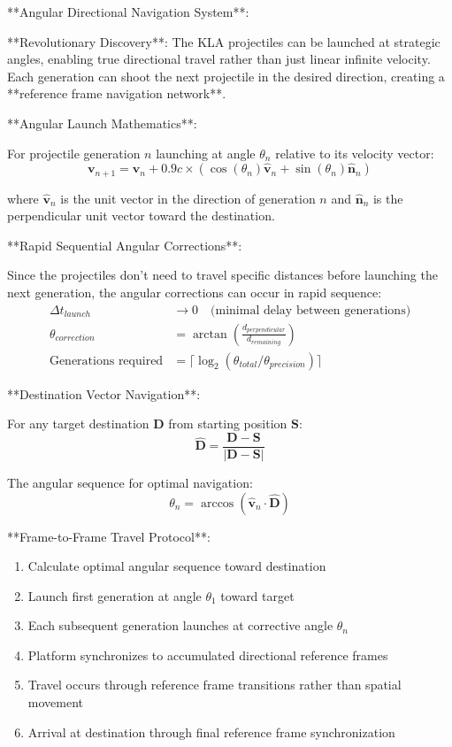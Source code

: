 \documentclass[12pt,a4paper]{article}
\theoremstyle{remark}
\begin{document}
**Angular Directional Navigation System**:

**Revolutionary Discovery**: The KLA projectiles can be launched at strategic angles, enabling true directional travel rather than just linear infinite velocity. Each generation can shoot the next projectile in the desired direction, creating a **reference frame navigation network**.

**Angular Launch Mathematics**:

For projectile generation $n$ launching at angle $\theta_n$ relative to its velocity vector:
\begin{equation}
\mathbf{v}_{n+1} = \mathbf{v}_n + 0.9c \times (\cos(\theta_n)\hat{\mathbf{v}}_n + \sin(\theta_n)\hat{\mathbf{n}}_n)
\end{equation}

where $\hat{\mathbf{v}}_n$ is the unit vector in the direction of generation $n$ and $\hat{\mathbf{n}}_n$ is the perpendicular unit vector toward the destination.

**Rapid Sequential Angular Corrections**:

Since the projectiles don't need to travel specific distances before launching the next generation, the angular corrections can occur in rapid sequence:
\begin{align}
\Delta t_{launch} &\rightarrow 0 \quad \text{(minimal delay between generations)} \\
\theta_{correction} &= \arctan\left(\frac{d_{perpendicular}}{d_{remaining}}\right) \\
\text{Generations required} &= \lceil \log_2(\theta_{total}/\theta_{precision}) \rceil
\end{align}

**Destination Vector Navigation**:

For any target destination $\mathbf{D}$ from starting position $\mathbf{S}$:
\begin{equation}
\hat{\mathbf{D}} = \frac{\mathbf{D} - \mathbf{S}}{|\mathbf{D} - \mathbf{S}|}
\end{equation}

The angular sequence for optimal navigation:
\begin{equation}
\theta_n = \arccos(\hat{\mathbf{v}}_n \cdot \hat{\mathbf{D}})
\end{equation}

**Frame-to-Frame Travel Protocol**:

\begin{enumerate}
\item Calculate optimal angular sequence toward destination
\item Launch first generation at angle $\theta_1$ toward target
\item Each subsequent generation launches at corrective angle $\theta_n$
\item Platform synchronizes to accumulated directional reference frames
\item Travel occurs through reference frame transitions rather than spatial movement
\item Arrival at destination through final reference frame synchronization
\end{enumerate}
\end{document}
